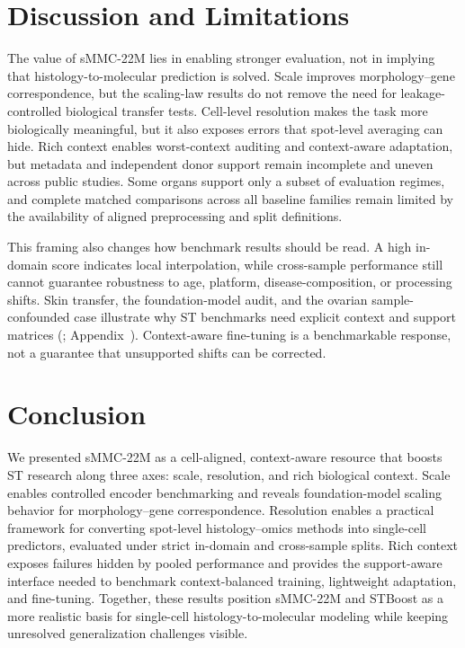\documentclass[sigconf,review]{acmart}
\newcommand{\dataset}{sMMC-22M\xspace}
\newcommand{\methodname}{STBoost\xspace}
\begin{document}
\section{Discussion and Limitations}
The value of \dataset lies in enabling stronger evaluation, not in implying that histology-to-molecular prediction is solved. Scale improves morphology--gene correspondence, but the scaling-law results do not remove the need for leakage-controlled biological transfer tests. Cell-level resolution makes the task more biologically meaningful, but it also exposes errors that spot-level averaging can hide. Rich context enables worst-context auditing and context-aware adaptation, but metadata and independent donor support remain incomplete and uneven across public studies. Some organs support only a subset of evaluation regimes, and complete matched comparisons across all baseline families remain limited by the availability of aligned preprocessing and split definitions.

This framing also changes how benchmark results should be read. A high
in-domain score indicates local interpolation, while cross-sample performance
still cannot guarantee robustness to age, platform, disease-composition, or
processing shifts. Skin transfer, the foundation-model audit, and the ovarian
sample-confounded case illustrate why ST benchmarks need explicit context and
support matrices (;
Appendix~). Context-aware fine-tuning is a
benchmarkable response, not a guarantee that unsupported shifts can be
corrected.

\section{Conclusion}
We presented \dataset as a cell-aligned, context-aware resource that boosts ST research along three axes: scale, resolution, and rich biological context. Scale enables controlled encoder benchmarking and reveals foundation-model scaling behavior for morphology--gene correspondence. Resolution enables a practical framework for converting spot-level histology--omics methods into single-cell predictors, evaluated under strict in-domain and cross-sample splits. Rich context exposes failures hidden by pooled performance and provides the support-aware interface needed to benchmark context-balanced training, lightweight adaptation, and fine-tuning. Together, these results position \dataset and \methodname as a more realistic basis for single-cell histology-to-molecular modeling while keeping unresolved generalization challenges visible.
\end{document}
